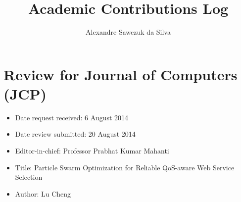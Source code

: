 \documentclass[a4paper,10pt]{article}
\title{Academic Contributions Log}
\author{Alexandre Sawczuk da Silva}
\begin{document}
\maketitle

\section{Review for Journal of Computers (JCP)}
\begin{itemize}
\item Date request received: 6 August 2014
\item Date review submitted: 20 August 2014
\item Editor-in-chief: Professor Prabhat Kumar Mahanti
\item Title: Particle Swarm Optimization for Reliable QoS-aware Web Service Selection
\item Author: Lu Cheng
\end{itemize}


\end{document}
